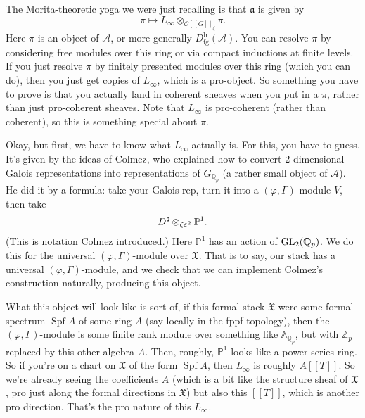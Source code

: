 \documentclass[reqno]{amsart} 
\begin{document}
The Morita-theoretic yoga we were just recalling is that $\mathfrak{a}$ is given by
\begin{equation*}
  \pi \mapsto L_\infty \otimes_{\mathcal{O}[[G]]_\zeta} \pi.
\end{equation*}
Here $\pi$ is an object of $\mathcal{A}$, or more generally $D_{\mathrm{fg}}^{\mathrm{b}}(\mathcal{A})$.  You can resolve $\pi$ by considering free modules over this ring or via compact inductions at finite levels.  If you just resolve $\pi$ by finitely presented modules over this ring (which you can do), then you just get copies of $L_\infty$, which is a pro-object.  So something you have to prove is that you actually land in coherent sheaves when you put in a $\pi$, rather than just pro-coherent sheaves.  Note that $L_\infty$ is pro-coherent (rather than coherent), so this is something special about $\pi$.

Okay, but first, we have to know what $L_\infty$ actually is.  For this, you have to guess.  It's given by the ideas of Colmez, who explained how to convert $2$-dimensional Galois representations into representations of $G_{\mathbb{Q}_p}$ (a rather small object of $\mathcal{A}$).  He did it by a formula: take your Galois rep, turn it into a $(\varphi, \Gamma)$-module $V$, then take
\begin{equation*}
  D^{\natural} \otimes _{\zeta \varepsilon^2} \mathbb{P}^1.
\end{equation*}
(This is notation Colmez introduced.)  Here $\mathbb{P} ^1$ has an action of $\operatorname{GL}_2(\mathbb{Q}_p)$.  We do this for the universal $(\varphi, \Gamma)$-module over $\mathfrak{X}$.  That is to say, our stack has a universal $(\varphi, \Gamma)$-module, and we check that we can implement Colmez's construction naturally, producing this object.

What this object will look like is sort of, if this formal stack $\mathfrak{X}$ were some formal spectrum $\operatorname{Spf} A$ of some ring $A$ (say locally in the fppf topology), then the $(\varphi, \Gamma)$-module is some finite rank module over something like $\mathbb{A}_{\mathbb{Q}_p}$, but with $\mathbb{Z}_p$ replaced by this other algebra $A$.  Then, roughly, $\mathbb{P}^1$ looks like a power series ring.  So if you're on a chart on $\mathfrak{X}$ of the form $\operatorname{Spf} A$, then $L_\infty$ is roughly $A[[T]]$.  So we're already seeing the coefficients $A$ (which is a bit like the structure sheaf of $\mathfrak{X}$, pro just along the formal directions in $\mathfrak{X}$) but also this $[[T]]$, which is another pro direction.  That's the pro nature of this $L_\infty$.
\end{document}
